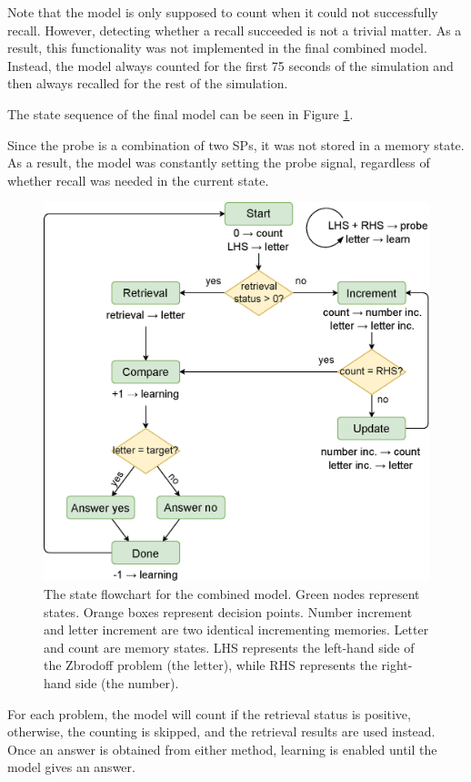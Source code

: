 \documentclass[10pt, a4paper, twocolumn]{article}
\begin{document}
Note that the model is only supposed to count when it could not successfully recall. However, detecting whether a recall succeeded is not a trivial matter. As a result, this functionality was not implemented in the final combined model. Instead, the model always counted for the first 75 seconds of the simulation and then always recalled for the rest of the simulation.

The state sequence of the final model can be seen in Figure \ref{fig:combined-model}.

Since the probe is a combination of two SPs, it was not stored in a memory state. As a result, the model was constantly setting the probe signal, regardless of whether recall was needed in the current state.

\begin{figure}[h]
	\centering
	\includegraphics[width=0.95\linewidth]{figures/combined-model.eps}
	\caption{The state flowchart for the combined model. Green nodes represent states. Orange boxes represent decision points. Number increment and letter increment are two identical incrementing memories. Letter and count are memory states. LHS represents the left-hand side of the Zbrodoff problem (the letter), while RHS represents the right-hand side (the number).}
	\label{fig:combined-model}
\end{figure}

For each problem, the model will count if the retrieval status is positive, otherwise, the counting is skipped, and the retrieval results are used instead. Once an answer is obtained from either method, learning is enabled until the model gives an answer.
\end{document}
